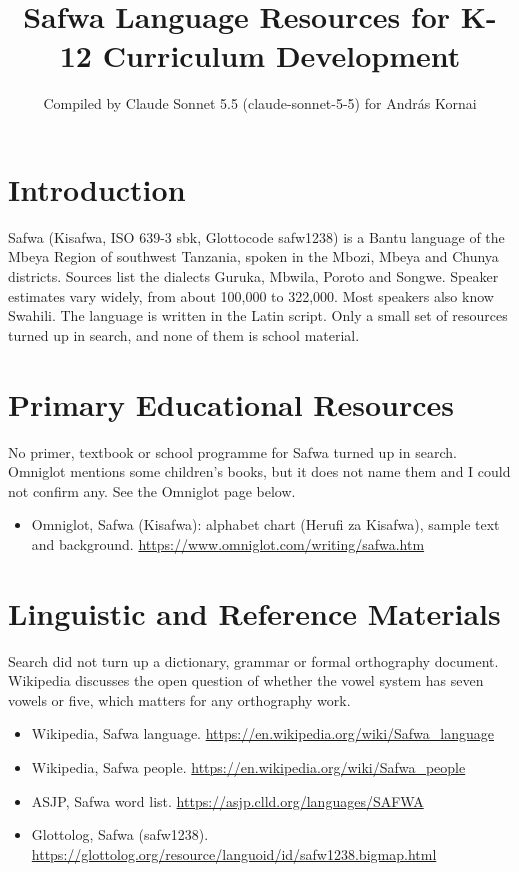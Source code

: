 \documentclass[12pt]{article}
\title{Safwa Language Resources for K-12 Curriculum Development}
\author{Compiled by Claude Sonnet 5.5 (claude-sonnet-5-5) for Andr\'as Kornai}
\date{}
\begin{document}
\maketitle

\section{Introduction}
Safwa (Kisafwa, ISO 639-3 sbk, Glottocode safw1238) is a Bantu language of the Mbeya Region of southwest Tanzania, spoken in the Mbozi, Mbeya and Chunya districts. Sources list the dialects Guruka, Mbwila, Poroto and Songwe. Speaker estimates vary widely, from about 100,000 to 322,000. Most speakers also know Swahili. The language is written in the Latin script. Only a small set of resources turned up in search, and none of them is school material.

\section{Primary Educational Resources}
No primer, textbook or school programme for Safwa turned up in search. Omniglot mentions some children's books, but it does not name them and I could not confirm any. See the Omniglot page below.
\begin{itemize}
\item Omniglot, Safwa (Kisafwa): alphabet chart (Herufi za Kisafwa), sample text and background. \url{https://www.omniglot.com/writing/safwa.htm}
\end{itemize}

\section{Linguistic and Reference Materials}
Search did not turn up a dictionary, grammar or formal orthography document. Wikipedia discusses the open question of whether the vowel system has seven vowels or five, which matters for any orthography work.
\begin{itemize}
\item Wikipedia, Safwa language. \url{https://en.wikipedia.org/wiki/Safwa_language}
\item Wikipedia, Safwa people. \url{https://en.wikipedia.org/wiki/Safwa_people}
\item ASJP, Safwa word list. \url{https://asjp.clld.org/languages/SAFWA}
\item Glottolog, Safwa (safw1238). \url{https://glottolog.org/resource/languoid/id/safw1238.bigmap.html}
\end{itemize}
\end{document}
